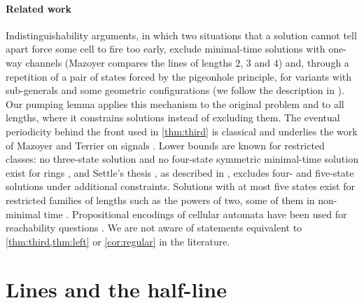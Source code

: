 \documentclass[3p]{elsarticle}
\theoremstyle{remark}
\begin{document}
\paragraph{Related work} Indistinguishability arguments, in which two
situations that a solution cannot tell apart force some cell to fire too
early, exclude minimal-time solutions with one-way channels (Mazoyer
\cite[Prop.~2]{Mazoyer96} compares the lines of lengths $2$, $3$ and $4$) and,
through a repetition of a pair of states forced by the pigeonhole principle,
for variants with sub-generals and some geometric configurations
\cite{YamashitaEtAl14,Kobayashi19} (we follow the description in
\cite{Kobayashi19}). Our pumping lemma applies this mechanism to the original
problem and to all lengths, where it constrains solutions instead of excluding
them. The eventual periodicity behind the front used in \cref{thm:third} is
classical and underlies the work of Mazoyer and Terrier on signals
\cite{MazoyerTerrier94,MazoyerTerrier99}. Lower bounds are known for restricted
classes: no three-state solution and no four-state symmetric minimal-time
solution exist for rings \cite{BerthiaumeEtAl04}, and Settle's thesis
\cite{Settle99}, as described in \cite{Correa17}, excludes four- and five-state
solutions under additional constraints. Solutions with at most five states
exist for restricted families of lengths such as the powers of two, some of
them in non-minimal time \cite{UmeoYanagihara07,Yunes08}. Propositional
encodings of cellular automata have been used for reachability questions
\cite{DAntonioDelzanno04}. We are not aware of statements equivalent to
\cref{thm:third,thm:left} or \cref{cor:regular} in the literature.

\section{Lines and the half-line}\label{sec:prelim}
\end{document}
